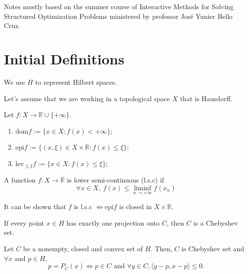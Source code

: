 Notes mostly based on the summer course of Interactive Methods for Solving Structured Optimization Problems
ministered by professor José Yunier Bello Cruz.

\section{Initial Definitions}

We use $H$ to represent Hilbert spaces.

Let's assume that we are working in a topological space $X$ that is Hausdorff.
\begin{definition}
    Let $f: X \to \mathbb R \cup \{+\infty\}$.
    \begin{enumerate}
        \item $\text{dom} f:= \{ x \in X : f(x) < +\infty \}$;
        \item $\text{epi} f:= \{ (x, \xi) \in X \times \mathbb R : f(x) \leq \xi \}$;
        \item $\text{lev}_{\leq \xi} f:= \{ x \in X : f(x) \leq \xi\}$;
    \end{enumerate}
\end{definition}

\begin{definition}
  A function $f:X \to \overline{\mathbb R}$ is lower semi-continuous (l.s.c) if
  \begin{equation}
    \forall x \in X, \ f(x) \leq
    \underset{n\to +\infty}{\liminf}f(x_n)
  \end{equation}
  \label{def:lsc}
\end{definition}

It can be shown that $f$ is l.s.c $ \iff \text{epi} f$ is closed in $X \times \mathbb R$.

\begin{definition}
    If every point $x \in H$ has exactly one projection onto $C$, then $C$
    is a Chebyshev set.
\end{definition}

\begin{theorem}
    Let $C$ be a nonempty, closed and convex set of $H$. Then, $C$ is Chebyshev set and
    $\forall x$ and  $p \in H$,
    \begin{displaymath}
        p = P_C(x) \iff p \in C \text{ and } \forall y \in C, \langle y-p, x-p \rangle \leq 0.
    \end{displaymath}
    
\end{theorem}

